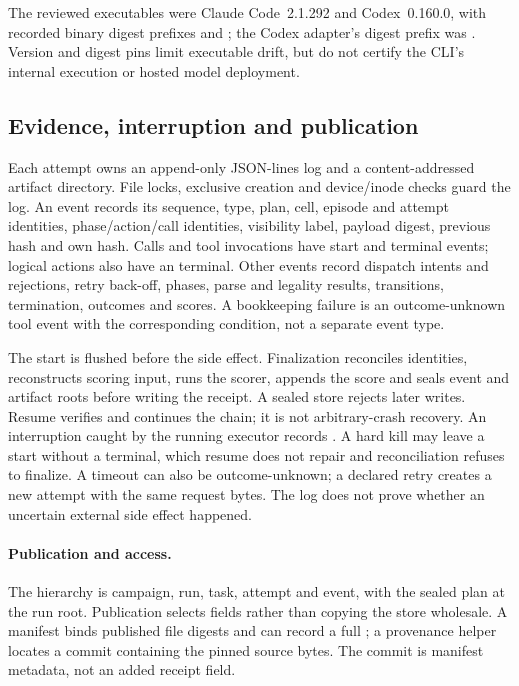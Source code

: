 The reviewed executables were Claude Code~2.1.292 and Codex~0.160.0,
with recorded binary digest prefixes  and
; the Codex adapter's digest prefix was .
Version and digest pins limit executable drift, but do not certify the
CLI's internal execution or hosted model deployment.

\subsection{Evidence, interruption and publication}
\label{app:runtime-evidence}

Each attempt owns an append-only JSON-lines log and a content-addressed
artifact directory. File locks, exclusive creation and device/inode
checks guard the log. An event records its sequence, type, plan, cell,
episode and attempt identities, phase/action/call identities,
visibility label, payload digest, previous hash and own hash. Calls and
tool invocations have start and terminal events; logical actions also
have an  terminal. Other events record
dispatch intents and rejections, retry back-off, phases, parse and
legality results, transitions, termination, outcomes and scores. A
bookkeeping failure is an outcome-unknown tool event with the
corresponding condition, not a separate event type.

The start is flushed before the side effect. Finalization reconciles
identities, reconstructs scoring input, runs the scorer, appends the
score and seals event and artifact roots before writing the receipt.
A sealed store rejects later writes. Resume verifies and continues the
chain; it is not arbitrary-crash recovery. An interruption caught by the
running executor records . A hard kill may leave
a start without a terminal, which resume does not repair and
reconciliation refuses to finalize. A timeout can also be
outcome-unknown; a declared retry creates a new attempt with the same
request bytes. The log does not prove whether an uncertain external
side effect happened.

\paragraph{Publication and access.}
The hierarchy is campaign, run, task, attempt and event, with the sealed
plan at the run root. Publication selects fields rather than copying
the store wholesale. A manifest binds published file digests and can
record a full ; a provenance helper locates a
commit containing the pinned source bytes. The commit is manifest
metadata, not an added receipt field.

